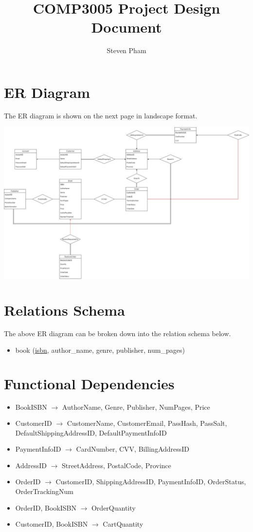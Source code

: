 \documentclass{article}
\title{COMP3005 Project Design Document}
\author{Steven Pham}
\newcommand{\schema}[2]{#1 (#2)}
\newcommand{\pkey}[1]{\underline{#1}}
\begin{document}
\maketitle
\section{ER Diagram}
The ER diagram is shown on the next page in landscape format.

\begin{landscape}
\includegraphics[width=\textwidth]{er}
\end{landscape}

\section{Relations Schema}
The above ER diagram can be broken down into the relation schema below.
\begin{itemize}
        \item \schema{book}{\pkey{isbn}, author_name, genre, publisher, num_pages}
\end{itemize}

\section{Functional Dependencies}
\begin{itemize}
  \item BookISBN \(\rightarrow\) AuthorName, Genre, Publisher, NumPages, Price
  \item CustomerID \(\rightarrow\) CustomerName, CustomerEmail, PassHash, PassSalt, DefaultShippingAddressID, DefaultPaymentInfoID
  \item PaymentInfoID \(\rightarrow\) CardNumber, CVV, BillingAddressID
  \item AddressID \(\rightarrow\) StreetAddress, PostalCode, Province
  \item OrderID \(\rightarrow\) CustomerID, ShippingAddressID, PaymentInfoID, OrderStatus, OrderTrackingNum
  \item OrderID, BookISBN \(\rightarrow\) OrderQuantity
  \item CustomerID, BookISBN \(\rightarrow\) CartQuantity
\end{itemize}
\end{document}

